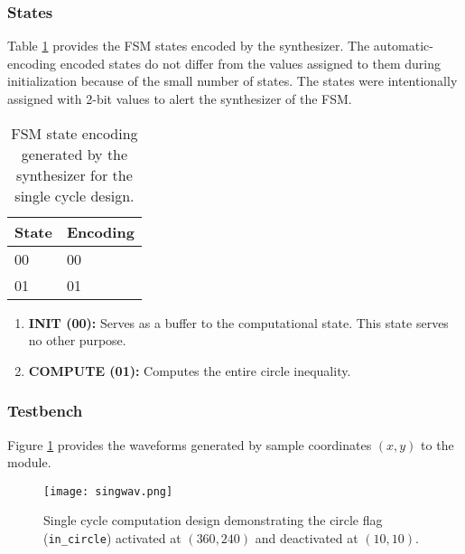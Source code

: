 \documentclass[paper=usletter, fontsize=12pt]{article}
\begin{document}
        \subsubsection{States} Table \ref{table:singlefsmcode} provides the FSM
        states encoded by the synthesizer. The automatic-encoding encoded
        states do not differ from the values assigned to them during
        initialization because of the small number of states. The states were
        intentionally assigned with 2-bit values to alert the synthesizer of
        the FSM.

        \begin{table}[h]
            \caption{FSM state encoding generated by the synthesizer for the
            single cycle design.}
            \label{table:singlefsmcode}
            \centering
            \begin{tabular}{ m{5em}m{5em} }
                \hline
                \textbf{State}  &    \textbf{Encoding} \\
                \hline
                00              &    00 \\
                01              &    01 \\
                \hline
            \end{tabular}
        \end{table}
        \newpage

        \begin{enumerate}

            \item \textbf{INIT (00): } Serves as a buffer to the computational
            state. This state serves no other purpose.

            \item \textbf{COMPUTE (01): } Computes the entire circle
            inequality.

        \end{enumerate}

        \subsubsection{Testbench} Figure \ref{fig:singwav} provides the
        waveforms generated by sample coordinates $(x, y)$ to the module.
        \begin{figure}[ht]
            \begin{center}
                \texttt{[image: singwav.png]}
                \caption{Single cycle computation design demonstrating the
                circle flag (\texttt{in\_circle}) activated at $(360, 240)$ and
                deactivated at $(10,10)$.}
                \label{fig:singwav}
            \end{center}
        \end{figure}
\end{document}
